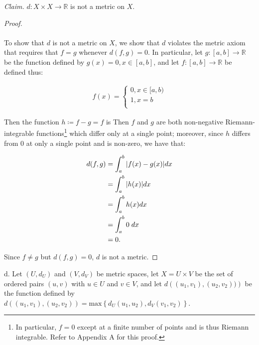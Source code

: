     \emph{Claim.} $d: X \times X \to \mathbb{R}$ is not a metric on $X$.
    \ \\

    \begin{proof}\ \\\\
        To show that $d$ is not a metric on $X$, we show that $d$ violates the metric axiom that requires
        that $f = g$ whenever $d(f, g) = 0$. In particular, let $g:[a, b] \to \mathbb{R}$ be the function defined
        by $g(x) = 0, x \in [a, b]$, and let $f:[a, b] \to \mathbb{R}$ be defined thus:

        \begin{align*}
            f(x) = \begin{cases}
                0, x \in [a, b) \\
                1, x = b \\
            \end{cases}
        \end{align*}

        Then the function $h \coloneqq f - g = f$ is 
        Then $f$ and $g$ are both non-negative Riemann-integrable functions\footnote{
            In particular, $f = 0$ except at a finite number of points and is thus Riemann integrable. Refer to Appendix
            A for this proof.
        } which differ only at a single point; moreover, since $h$ differs from 0 at only a single point
        and is non-zero, we have that:
        
        \begin{align*}
            d(f, g) &= \int_a^b{|f(x) - g(x)|dx} \\
                    &= \int_a^b{|h(x)|dx} \\
                    &= \int_a^b{h(x) dx} \\
                    &= \int_a^b{0 \hspace{1mm} dx} \\
                    &= 0.
        \end{align*}

        Since $f \neq g$ but $d(f, g) = 0$, $d$ is not a metric.
            
    \end{proof}

    \pagebreak

d.  Let $(U, d_U)$ and $(V, d_V)$ be metric spaces, let $X = U \times V$
    be the set of ordered pairs $(u, v)$ with $u \in U$ and $v \in V$, and
    let $d\left((u_1, v_1), (u_2, v_2))\right)$ be the function defined by
    $d\left((u_1, v_1), (u_2, v_2)\right) 
     = \text{max}\left\{d_U(u_1, u_2), d_V(v_1, v_2)\right\}$. \ \\
    
